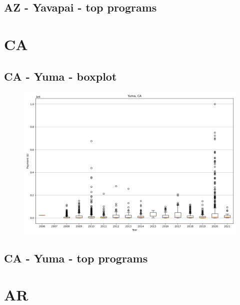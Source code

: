 \subsection*{AZ - Yavapai - top programs}

\newpage
\section*{CA}
\subsection*{CA - Yuma - boxplot}
\begin{figure}[h]
\centering
\includegraphics[width=7in]{../output/boxplots/counties/Yuma-CA_boxplot.png}
\end{figure}


\subsection*{CA - Yuma - top programs}

\newpage
\section*{AR}
